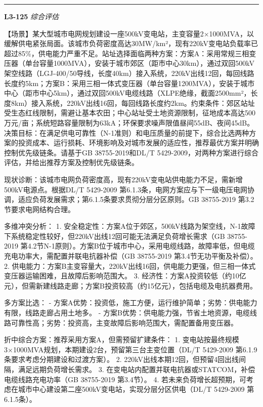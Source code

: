 \documentclass[12pt,a4paper]{ctexart}
\begin{document}
\vspace{4pt}
\hrule\vspace{6pt}

\noindent\textbf{L3-125} \hfill \textit{综合评估}
\begin{description}[leftmargin=1.5em,style=nextline,font=\normalfont]
  \item[Q:] 【场景】某大型城市电网规划建设一座500kV变电站，主变容量2×1000MVA，以缓解供电紧张局面。该城市负荷密度高达30MW/km²，现有220kV变电站负载率已超过85\%，供电能力严重不足。站址选择面临两种方案：方案A：采用常规三相变压器（单台容量1000MVA），安装于城市郊区（距市中心30km），通过双回500kV架空线路（LGJ-400/50导线，长度40km）接入系统，220kV出线12回，每回线路长度约5km；方案B：采用三相一体式变压器（单台容量1200MVA），安装于城市中心（距市中心5km），通过双回500kV电缆线路（XLPE绝缘，截面2500mm²，长度8km）接入系统，220kV出线16回，每回线路长度约2km。约束条件：郊区站址受生态红线限制，需避让基本农田；中心站址受土地资源限制，征地成本高达500万元/亩；系统短路容量限制为63kA；环保要求噪声限值昼间55dB、夜间45dB。决策目标：在满足供电可靠性（N-1准则）和电压质量的前提下，综合比选两种方案的投资成本、运行损耗、环境影响及对城市发展的适应性，推荐最优方案并明确控制优先级链条。请基于GB 38755-2019和DL/T 5429-2009，对两种方案进行综合评估，并给出推荐方案及控制优先级链条。
  \item[A:] 现状诊断：该城市电网负荷密度高，现有220kV变电站供电能力不足，需新增500kV电源点。根据DL/T 5429-2009 第6.1.3条，电网方案应与下一级电压电网协调，适应负荷发展需求；第6.1.5条要求贯彻分层分区原则。GB 38755-2019 第3.2节要求电网结构合理。

多维冲突分析：
1. 安全稳定性：方案A位于郊区，500kV线路为架空线，N-1故障下系统稳定性较好，但220kV出线12回可能无法满足负荷增长需求（GB 38755-2019 第4.2节N-1原则）。方案B位于城市中心，采用电缆线路，故障率低，但电缆充电功率大，需配置并联电抗器补偿（GB 38755-2019 第3.4节无功平衡及补偿）。
2. 供电能力：方案B主变容量大，220kV出线16回，供电能力更强，但三相一体式变压器运输困难，且故障后影响范围大。
3. 经济性：方案A投资较低（约10亿元），但需新建线路走廊；方案B投资较高（约15亿元），包括电缆及电抗器费用。

多方案比选：
- 方案A优势：投资低，施工方便，运行维护简单；劣势：供电能力有限，线路走廊占用土地多。
- 方案B优势：供电能力强，节省土地资源，电缆线路可靠性高；劣势：投资高，主变故障后影响范围大，需配置备用变压器。

折中综合方案：推荐采用方案A，但需预留扩建条件：
1. 变电站按最终规模3×1000MVA规划，本期建设2台，预留第三台主变位置（DL/T 5429-2009 第6.1.9条要求考虑分期建设和过渡方案）。
2. 220kV出线本期12回，但预留4回出线间隔，满足远期负荷增长需求。
3. 在变电站内配置并联电抗器或STATCOM，补偿电缆线路充电功率（GB 38755-2019 第3.4节）。
4. 若未来负荷增长超预期，可考虑在城市中心建设第二座500kV变电站，实现分层分区供电（DL/T 5429-2009 第6.1.5条）。


\end{description}
\end{document}
